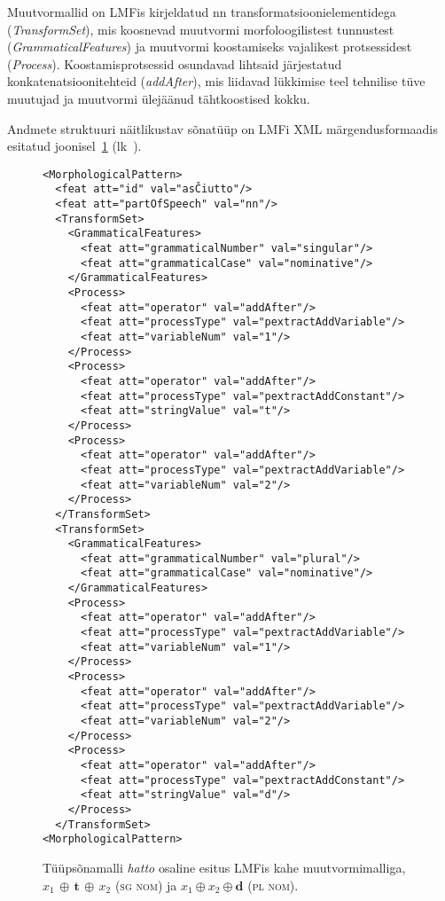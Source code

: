 \documentclass[12pt,a4paper]{article}
\newcommand{\vadja}[1]{\textit{#1}}
\newcommand{\msd}[1]{\textsc{#1}}
\begin{document}
Muutvormallid on LMFis kirjeldatud nn transformatsiooni\-elementidega (\textit{TransformSet}), mis koosnevad muutvormi morfoloogilistest tunnustest (\textit{GrammaticalFeatures}) ja muutvormi koostamiseks vajalikest protsessidest (\textit{Process}). Koostamis\-protsessid osundavad lihtsaid järjestatud konkatenatsiooni\-tehteid (\textit{addAfter}), mis liidavad lükkimise teel tehnilise tüve muutujad ja muutvormi ülejäänud tähtkoostised kokku.

Andmete struktuuri näitlikustav sõnatüüp on LMFi XML märgendus\-formaadis esitatud joonisel~\ref{code:lmf-paradigmpattern} (lk~\pageref{code:lmf-paradigmpattern}).

\begin{figure}[h]
  \center
\begin{verbatim}
<MorphologicalPattern>
  <feat att="id" val="asČiutto"/>
  <feat att="partOfSpeech" val="nn"/>
  <TransformSet>
    <GrammaticalFeatures>
      <feat att="grammaticalNumber" val="singular"/>
      <feat att="grammaticalCase" val="nominative"/>
    </GrammaticalFeatures>
    <Process>
      <feat att="operator" val="addAfter"/>
      <feat att="processType" val="pextractAddVariable"/>
      <feat att="variableNum" val="1"/>
    </Process>
    <Process>
      <feat att="operator" val="addAfter"/>
      <feat att="processType" val="pextractAddConstant"/>
      <feat att="stringValue" val="t"/>
    </Process>
    <Process>
      <feat att="operator" val="addAfter"/>
      <feat att="processType" val="pextractAddVariable"/>
      <feat att="variableNum" val="2"/>
    </Process>
  </TransformSet>
  <TransformSet>
    <GrammaticalFeatures>
      <feat att="grammaticalNumber" val="plural"/>
      <feat att="grammaticalCase" val="nominative"/>
    </GrammaticalFeatures>
    <Process>
      <feat att="operator" val="addAfter"/>
      <feat att="processType" val="pextractAddVariable"/>
      <feat att="variableNum" val="1"/>
    </Process>
    <Process>
      <feat att="operator" val="addAfter"/>
      <feat att="processType" val="pextractAddVariable"/>
      <feat att="variableNum" val="2"/>
    </Process>
    <Process>
      <feat att="operator" val="addAfter"/>
      <feat att="processType" val="pextractAddConstant"/>
      <feat att="stringValue" val="d"/>
    </Process>
  </TransformSet>
<MorphologicalPattern>
\end{verbatim}
\caption{Tüüpsõnamalli \vadja{hatto} osaline esitus LMF\-is kahe muutvormimalliga, $x_1\,\oplus\,\textbf{t}\,\oplus\,x_2$ (\msd{sg nom}) ja $x_1 \oplus x_2 \oplus \textbf{d}$ (\msd{pl nom}).
  \label{code:lmf-paradigmpattern}}
\end{figure}
\end{document}
